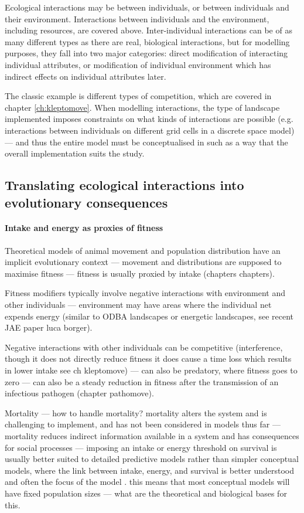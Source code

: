 Ecological interactions may be between individuals, or between individuals and their environment.
Interactions between individuals and the environment, including resources, are covered above.
Inter-individual interactions can be of as many different types as there are real, biological interactions, but for modelling purposes, they fall into two major categories: direct modification of interacting individual attributes, or modification of individual environment which has indirect effects on individual attributes later.

The classic example is different types of competition, which are covered in chapter \ref{ch:kleptomove}.
When modelling interactions, the type of landscape implemented imposes constraints on what kinds of interactions are possible (e.g. interactions between individuals on different grid cells in a discrete space model) --- and thus the entire model must be conceptualised in such as a way that the overall implementation suits the study.

\subsection*{Translating ecological interactions into evolutionary consequences}

\paragraph*{Intake and energy as proxies of fitness} 

Theoretical models of animal movement and population distribution have an implicit evolutionary context --- movement and distributions are supposed to maximise fitness --- fitness is usually proxied by intake (chapters chapters).

Fitness modifiers typically involve negative interactions with environment and other individuals --- environment may have areas where the individual net expends energy (similar to ODBA landscapes or energetic landscapes, see recent JAE paper luca borger).

Negative interactions with other individuals can be competitive (interference, though it does not directly reduce fitness it does cause a time loss which results in lower intake see ch kleptomove) --- can also be predatory, where fitness goes to zero --- can also be a steady reduction in fitness after the transmission of an infectious pathogen (chapter pathomove).

Mortality --- how to handle mortality? mortality alters the system and is challenging to implement, and has not been considered in models thus far --- mortality reduces indirect information available in a system and has consequences for social processes --- imposing an intake or energy threshold on survival is usually better suited to detailed predictive models rather than simpler conceptual models, where the link between intake, energy, and survival is better understood and often the focus of the model \citep{stillman2010}.
this means that most conceptual models will have fixed population sizes --- what are the theoretical and biological bases for this.

